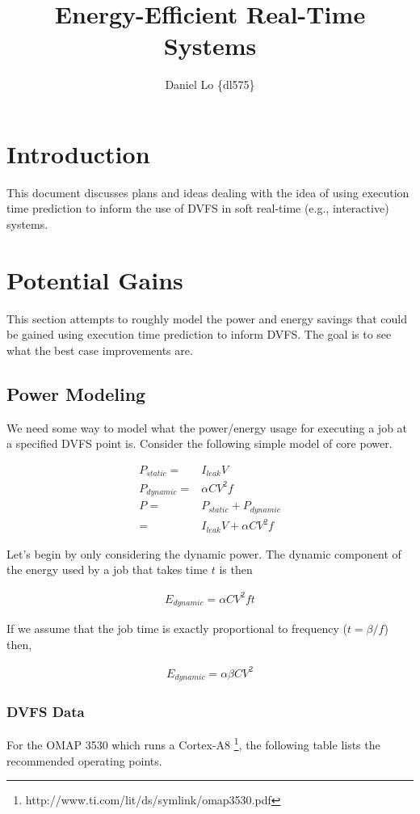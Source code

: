 \documentclass[11pt, letterpaper]{article}
\title{Energy-Efficient Real-Time Systems}
\author{Daniel Lo \{dl575\}}
\providecommand{\eq}[1]{
		\begin{align*}
		#1
		\end{align*}
	}
\begin{document}

\section{Introduction}

This document discusses plans and ideas dealing with the idea of using
execution time prediction to inform the use of DVFS in soft real-time (e.g.,
interactive) systems.

\section{Potential Gains}

This section attempts to roughly model the power and energy savings that could
be gained using execution time prediction to inform DVFS. The goal is to see
what the best case improvements are.

\subsection{Power Modeling}

We need some way to model what the power/energy usage for executing a job at a
specified DVFS point is. Consider the following simple model of core power.

\eq{
  P_{static} =& I_{leak}V \\
  P_{dynamic} =& \alpha C V^2 f \\
  P =& P_{static} + P_{dynamic} \\
  =& I_{leak}V + \alpha C V^2 f 
}

Let's begin by only considering the dynamic power. The dynamic component of the energy used by a job that takes time $t$ is then
\eq{
  E_{dynamic} = \alpha C V^2 f t
}
If we assume that the job time is exactly proportional to frequency ($t = \beta/f$) then,
\eq{
  E_{dynamic} = \alpha \beta C V^2
}

\subsubsection{DVFS Data}

For the OMAP 3530 which runs a Cortex-A8
\footnote{http://www.ti.com/lit/ds/symlink/omap3530.pdf}, the following table
lists the recommended operating points.
\end{document}
